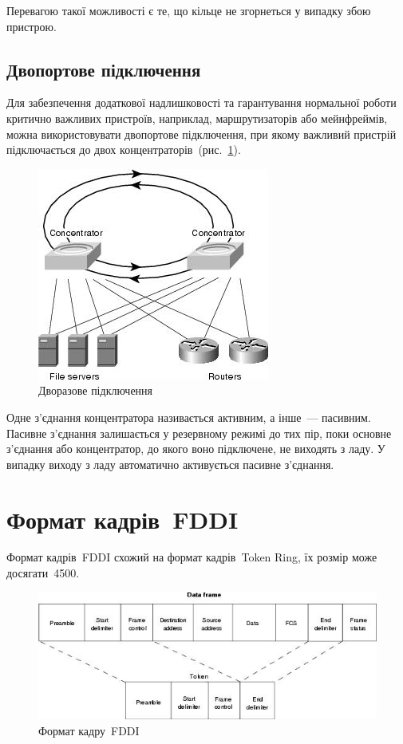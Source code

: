 \documentclass[
	a4paper,
	oneside,
	BCOR = 10mm,
	DIV = 12,
	12pt,
	headings = normal,
]{scrartcl}
\begin{document}
			Перевагою такої можливості є те, що кільце не згорнеться у випадку збою пристрою.

		\subsection{Двопортове підключення}
			Для забезпечення додаткової надлишковості та гарантування нормальної роботи критично важливих пристроїв, наприклад, маршрутизаторів або мейнфреймів, можна використовувати двопортове підключення, при якому важливий пристрій підключається до двох концентраторів~(рис.~\ref{fig:dual-homing}).

			\begin{figure}
				\centering
				\includegraphics[height = 10\baselineskip]{./assets/y03s01-telecom-homework-01-p08-dual-homing.jpg}
				\caption{Дворазове підключення}
				\label{fig:dual-homing}
			\end{figure}

			Одне з'єднання концентратора називається активним, а інше~— пасивним. Пасивне з'єднання залишається у резервному режимі до тих пір, поки основне з'єднання або концентратор, до якого воно підключене, не виходять з ладу. У випадку виходу з ладу автоматично активується пасивне з'єднання.

	\section{Формат кадрів~\textenglish{FDDI}}
		Формат кадрів~\textenglish{FDDI} схожий на формат кадрів~\textenglish{Token Ring}, їх розмір може досягати~\SI{4500}{\byte}.

		\begin{figure}[!htbp]
			\centering
			\includegraphics[height = 10\baselineskip]{./assets/y03s01-telecom-homework-01-p09-fddi-frame-format.jpg}
			\caption{Формат кадру~\textenglish{FDDI}}
			\label{fig:fddi-frame-format}
		\end{figure}
\end{document}
